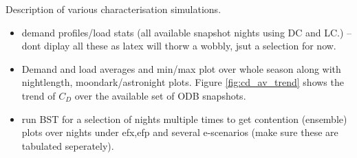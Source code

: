 Description of various characterisation simulations.
\begin{itemize}
\item demand profiles/load stats (all available snapshot nights using DC and LC.) -- dont diplay all these as latex will thorw a wobbly, jsut a selection for now.
\item Demand and load averages and min/max plot over whole season along with nightlength, moondark/astronight plots. Figure \ref{fig:cd_av_trend} shows the trend of $C_D$ over the available set of ODB snapshots.


\item run BST for a selection of nights multiple times to get contention (ensemble) plots over nights under efx,efp and several e-scenarios (make sure these are tabulated seperately).
\end{itemize}

